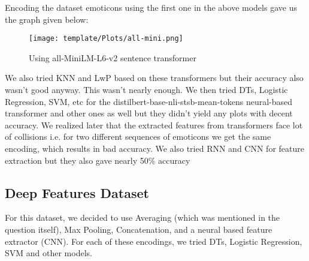 \documentclass{article} %
\begin{document}
Encoding the dataset emoticons using the first one in the above models gave us the graph given below:
\begin{figure}[h!]
    \centering
    \texttt{[image: template/Plots/all-mini.png]}
    \caption{Using all-MiniLM-L6-v2 sentence transformer}
    \label{fig:3}
\end{figure}


We also tried KNN and LwP based on these transformers but their accuracy also wasn't good anyway. This wasn't nearly enough. We then tried DTs, Logistic Regression, SVM, etc for the distilbert-base-nli-stsb-mean-tokens neural-based transformer and other ones as well but they didn't yield any plots with decent accuracy. We realized later that the extracted features from transformers face lot of collisions i.e. for two different sequences of emoticons we get the same encoding, which results in bad accuracy. We also tried RNN and CNN for feature extraction but they also gave nearly 50\% accuracy 





\subsection{Deep Features Dataset}
For this dataset, we decided to use Averaging (which was mentioned in the question itself), Max Pooling, Concatenation, and a neural based feature extractor (CNN). For each of these encodings, we tried DTs, Logistic Regression, SVM and other models.
\end{document}
